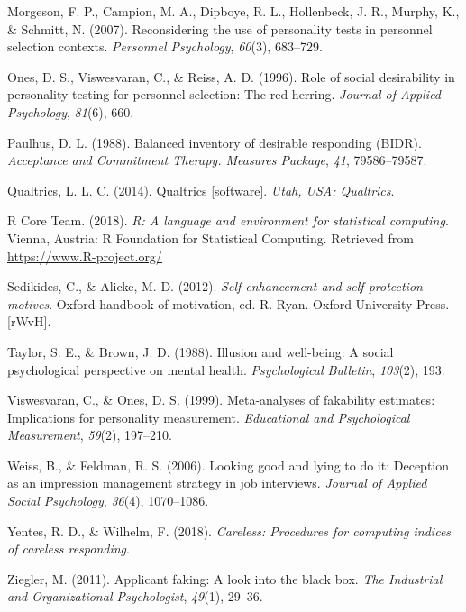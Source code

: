 \documentclass[
  english,
  ,jou]{apa6}
\begin{document}
\leavevmode\hypertarget{ref-morgeson_reconsidering_2007}{}%
Morgeson, F. P., Campion, M. A., Dipboye, R. L., Hollenbeck, J. R., Murphy, K., \& Schmitt, N. (2007). Reconsidering the use of personality tests in personnel selection contexts. \emph{Personnel Psychology}, \emph{60}(3), 683--729.

\leavevmode\hypertarget{ref-ones_role_1996}{}%
Ones, D. S., Viswesvaran, C., \& Reiss, A. D. (1996). Role of social desirability in personality testing for personnel selection: The red herring. \emph{Journal of Applied Psychology}, \emph{81}(6), 660.

\leavevmode\hypertarget{ref-paulhus_balanced_1988}{}%
Paulhus, D. L. (1988). Balanced inventory of desirable responding (BIDR). \emph{Acceptance and Commitment Therapy. Measures Package}, \emph{41}, 79586--79587.

\leavevmode\hypertarget{ref-qualtrics_qualtrics_2014}{}%
Qualtrics, L. L. C. (2014). Qualtrics {[}software{]}. \emph{Utah, USA: Qualtrics}.

\leavevmode\hypertarget{ref-R-base}{}%
R Core Team. (2018). \emph{R: A language and environment for statistical computing}. Vienna, Austria: R Foundation for Statistical Computing. Retrieved from \url{https://www.R-project.org/}

\leavevmode\hypertarget{ref-sedikides_self-enhancement_2012}{}%
Sedikides, C., \& Alicke, M. D. (2012). \emph{Self-enhancement and self-protection motives}. Oxford handbook of motivation, ed. R. Ryan. Oxford University Press.{[}rWvH{]}.

\leavevmode\hypertarget{ref-taylor_illusion_1988}{}%
Taylor, S. E., \& Brown, J. D. (1988). Illusion and well-being: A social psychological perspective on mental health. \emph{Psychological Bulletin}, \emph{103}(2), 193.

\leavevmode\hypertarget{ref-viswesvaran_meta-analyses_1999}{}%
Viswesvaran, C., \& Ones, D. S. (1999). Meta-analyses of fakability estimates: Implications for personality measurement. \emph{Educational and Psychological Measurement}, \emph{59}(2), 197--210.

\leavevmode\hypertarget{ref-weiss_looking_2006}{}%
Weiss, B., \& Feldman, R. S. (2006). Looking good and lying to do it: Deception as an impression management strategy in job interviews. \emph{Journal of Applied Social Psychology}, \emph{36}(4), 1070--1086.

\leavevmode\hypertarget{ref-R-careless}{}%
Yentes, R. D., \& Wilhelm, F. (2018). \emph{Careless: Procedures for computing indices of careless responding}.

\leavevmode\hypertarget{ref-ziegler_applicant_2011}{}%
Ziegler, M. (2011). Applicant faking: A look into the black box. \emph{The Industrial and Organizational Psychologist}, \emph{49}(1), 29--36.

\endgroup
\end{document}
